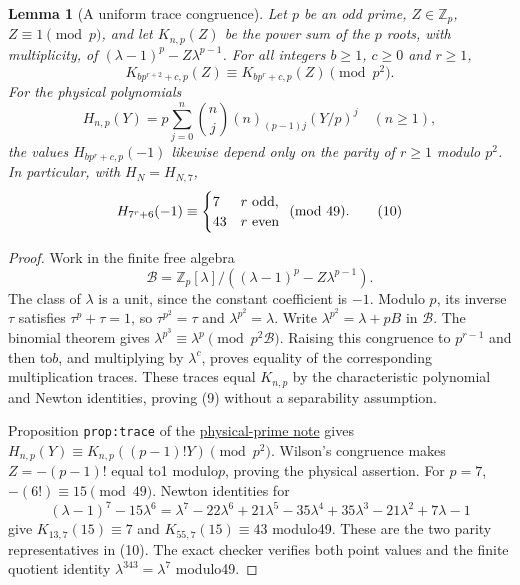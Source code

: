\documentclass[11pt]{article}
\newtheorem{lemma}{Lemma}\newtheorem{theorem}{Theorem}
\begin{document}
\begin{lemma}[A uniform trace congruence]\label{lem:trace-parity}
Let $p$ be an odd prime, $Z\in\mathbb Z_p$, $Z\equiv1\pmod p$,
and let $K_{n,p}(Z)$ be the power sum of the $p$ roots, with
multiplicity, of $(\lambda-1)^p-Z\lambda^{p-1}$.
For all integers $b\ge1$, $c\ge0$ and $r\ge1$,
\[
 K_{bp^{r+2}+c,p}(Z)\equiv K_{bp^r+c,p}(Z)\pmod{p^2}.    \tag{9}
\]
For the physical polynomials
\[
 H_{n,p}(Y)=p\sum_{j=0}^n\binom nj(n)_{(p-1)j}(Y/p)^j
 \quad(n\ge1),
\]
the values $H_{bp^r+c,p}(-1)$ likewise depend only on the parity
of $r\ge1$ modulo $p^2$.
In particular, with $H_N=H_{N,7}$,
\[
 H_{7^r+6}(-1)\equiv
 \begin{cases}7&r\ {\rm odd},\\43&r\ {\rm even}\end{cases}
                      \pmod{49}.                       \tag{10}
\]
\end{lemma}
\begin{proof}
Work in the finite free algebra
\[
 \mathcal B=\mathbb Z_p[\lambda]/
                    ((\lambda-1)^p-Z\lambda^{p-1}).
\]
The class of $\lambda$ is a unit, since the constant coefficient
is $-1$. Modulo $p$, its inverse $\tau$ satisfies
$\tau^p+\tau=1$, so $\tau^{p^2}=\tau$ and
$\lambda^{p^2}=\lambda$.
Write $\lambda^{p^2}=\lambda+pB$ in $\mathcal B$.
The binomial theorem gives
$\lambda^{p^3}\equiv\lambda^p\pmod{p^2\mathcal B}$.
Raising this congruence to $p^{r-1}$ and then to$b$,
and multiplying by $\lambda^c$, proves equality of the corresponding
multiplication traces.
These traces equal $K_{n,p}$ by the characteristic polynomial
and Newton identities, proving (9) without a separability assumption.

Proposition \texttt{prop:trace} of the
\href{PHYSICAL_PRIME_TOTAL_DEGREE_REDUCTION.tex}{physical-prime note}
gives
$H_{n,p}(Y)\equiv K_{n,p}((p-1)!Y)\pmod{p^2}$.
Wilson's congruence makes $Z=-(p-1)!$ equal to1 modulo$p$,
proving the physical assertion.
For $p=7$, $-(6!)\equiv15\pmod{49}$.
Newton identities for
\[
 (\lambda-1)^7-15\lambda^6
 =\lambda^7-22\lambda^6+21\lambda^5-35\lambda^4
      +35\lambda^3-21\lambda^2+7\lambda-1
\]
give $K_{13,7}(15)\equiv7$ and $K_{55,7}(15)\equiv43$ modulo49.
These are the two parity representatives in (10).
The exact checker verifies both point values and the finite
quotient identity $\lambda^{343}=\lambda^7$ modulo49.
\end{proof}
\end{document}
